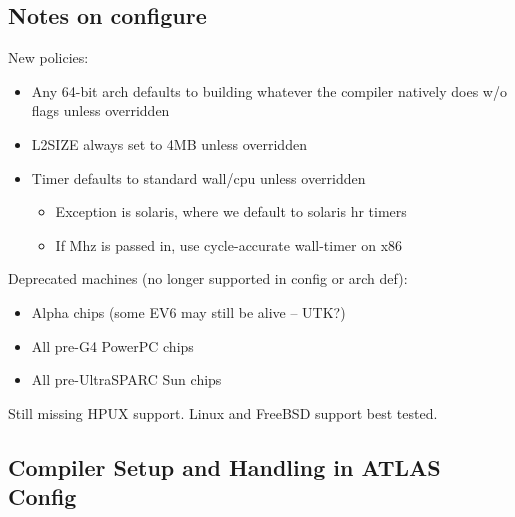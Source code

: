 \documentclass[11pt]{article}
\begin{document}
\subsection{Notes on configure}
New policies:
\begin{itemize}
\item Any 64-bit arch defaults to building whatever the compiler natively does
      w/o flags unless overridden
\item L2SIZE always set to 4MB unless overridden
\item Timer defaults to standard wall/cpu unless overridden
   \begin{itemize}
   \item Exception is solaris, where we default to solaris hr timers
   \item If Mhz is passed in, use cycle-accurate wall-timer on x86
   \end{itemize}
\end{itemize}

Deprecated machines (no longer supported in config or arch def):
\begin{itemize}
\item Alpha chips (some EV6 may still be alive -- UTK?)
\item All pre-G4 PowerPC chips
\item All pre-UltraSPARC Sun chips
\end{itemize}

Still missing HPUX support.  Linux and FreeBSD support best tested.

\subsection{Compiler Setup and Handling in ATLAS Config}
\label{sec-compProbe}
\end{document}
